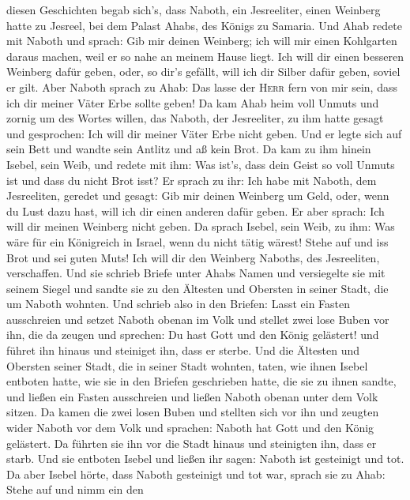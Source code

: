 diesen Geschichten begab sich's, dass Naboth, ein Jesreeliter, einen
Weinberg hatte zu Jesreel, bei dem Palast Ahabs, des Königs zu Samaria.
 Und Ahab redete mit Naboth und sprach: Gib mir deinen
Weinberg; ich will mir einen Kohlgarten daraus machen, weil er so nahe
an meinem Hause liegt. Ich will dir einen besseren Weinberg dafür geben,
oder, so dir's gefällt, will ich dir Silber dafür geben, soviel er gilt.
 Aber Naboth sprach zu Ahab: Das lasse der \textsc{Herr}
fern von mir sein, dass ich dir meiner Väter Erbe sollte geben!
 Da kam Ahab heim voll Unmuts und zornig um des Wortes
willen, das Naboth, der Jesreeliter, zu ihm hatte gesagt und gesprochen:
Ich will dir meiner Väter Erbe nicht geben. Und er legte sich auf sein
Bett und wandte sein Antlitz und aß kein Brot.  Da kam zu
ihm hinein Isebel, sein Weib, und redete mit ihm: Was ist's, dass dein
Geist so voll Unmuts ist und dass du nicht Brot isst?  Er
sprach zu ihr: Ich habe mit Naboth, dem Jesreeliten, geredet und gesagt:
Gib mir deinen Weinberg um Geld, oder, wenn du Lust dazu hast, will ich
dir einen anderen dafür geben. Er aber sprach: Ich will dir meinen
Weinberg nicht geben.  Da sprach Isebel, sein Weib, zu
ihm: Was wäre für ein Königreich in Israel, wenn du nicht tätig wärest!
Stehe auf und iss Brot und sei guten Muts! Ich will dir den Weinberg
Naboths, des Jesreeliten, verschaffen.  Und sie schrieb
Briefe unter Ahabs Namen und versiegelte sie mit seinem Siegel und
sandte sie zu den Ältesten und Obersten in seiner Stadt, die um Naboth
wohnten.  Und schrieb also in den Briefen: Lasst ein
Fasten ausschreien und setzet Naboth obenan im Volk  und
stellet zwei lose Buben vor ihn, die da zeugen und sprechen: Du hast
Gott und den König gelästert! und führet ihn hinaus und steiniget ihn,
dass er sterbe.  Und die Ältesten und Obersten seiner
Stadt, die in seiner Stadt wohnten, taten, wie ihnen Isebel entboten
hatte, wie sie in den Briefen geschrieben hatte, die sie zu ihnen
sandte,  und ließen ein Fasten ausschreien und ließen
Naboth obenan unter dem Volk sitzen.  Da kamen die zwei
losen Buben und stellten sich vor ihn und zeugten wider Naboth vor dem
Volk und sprachen: Naboth hat Gott und den König gelästert. Da führten
sie ihn vor die Stadt hinaus und steinigten ihn, dass er starb.
 Und sie entboten Isebel und ließen ihr sagen: Naboth ist
gesteinigt und tot.  Da aber Isebel hörte, dass Naboth
gesteinigt und tot war, sprach sie zu Ahab: Stehe auf und nimm ein den

